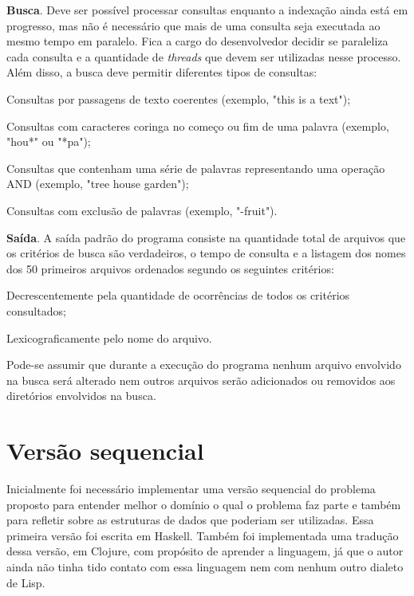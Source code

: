 \textbf{Busca}. Deve ser possível processar consultas enquanto a indexação ainda está em progresso, mas não é necessário que mais de uma consulta seja executada ao mesmo tempo em paralelo. Fica a cargo do desenvolvedor decidir se paraleliza cada consulta e a quantidade de \emph{threads} que devem ser utilizadas nesse processo. Além disso, a busca deve permitir diferentes tipos de consultas:
\begin{compactenum}
  \item Consultas por passagens de texto coerentes (exemplo, "this is a text");
  \item Consultas com caracteres coringa no começo ou fim de uma palavra (exemplo, "hou*" ou "*pa");
  \item Consultas que contenham uma série de palavras representando uma operação AND (exemplo, "tree house garden");
  \item Consultas com exclusão de palavras (exemplo, "-fruit").
\end{compactenum}

\textbf{Saída}. A saída padrão do programa consiste na quantidade total de arquivos que os critérios de busca são verdadeiros, o tempo de consulta e a listagem dos nomes dos 50 primeiros arquivos ordenados segundo os seguintes critérios:
\begin{compactenum}
  \item Decrescentemente pela quantidade de ocorrências de todos os critérios consultados;
  \item Lexicograficamente pelo nome do arquivo.
\end{compactenum}

Pode-se assumir que durante a execução do programa nenhum arquivo envolvido na busca será alterado nem outros arquivos serão adicionados ou removidos aos diretórios envolvidos na busca.

\section{Versão sequencial}

Inicialmente foi necessário implementar uma versão sequencial do problema proposto para entender melhor o domínio o qual o problema faz parte e também para refletir sobre as estruturas de dados que poderiam ser utilizadas. Essa primeira versão foi escrita em Haskell. Também foi implementada uma tradução dessa versão, em Clojure, com propósito de aprender a linguagem, já que o autor ainda não tinha tido contato com essa linguagem nem com nenhum outro dialeto de Lisp.

